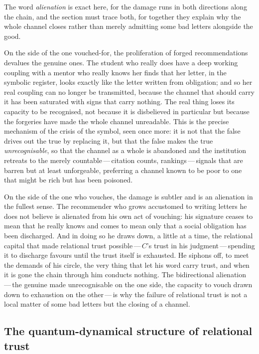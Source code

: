 The word \emph{alienation} is exact here, for the damage runs in both directions along the chain, and the section must trace both, for together they explain why the whole channel closes rather than merely admitting some bad letters alongside the good.

On the side of the one vouched-for, the proliferation of forged recommendations devalues the genuine ones. The student who really does have a deep working coupling with a mentor who really knows her finds that her letter, in the symbolic register, looks exactly like the letter written from obligation; and so her real coupling can no longer be transmitted, because the channel that should carry it has been saturated with signs that carry nothing. The real thing loses its capacity to be recognised, not because it is disbelieved in particular but because the forgeries have made the whole channel unreadable. This is the precise mechanism of the crisis of the symbol, seen once more: it is not that the false drives out the true by replacing it, but that the false makes the true \emph{unrecognisable}, so that the channel as a whole is abandoned and the institution retreats to the merely countable\,---\,citation counts, rankings\,---\,signals that are barren but at least unforgeable, preferring a channel known to be poor to one that might be rich but has been poisoned.

On the side of the one who vouches, the damage is subtler and is an alienation in the fullest sense. The recommender who grows accustomed to writing letters he does not believe is alienated from his own act of vouching: his signature ceases to mean that he really knows and comes to mean only that a social obligation has been discharged. And in doing so he draws down, a little at a time, the relational capital that made relational trust possible\,---\,$C$'s trust in his judgment\,---\,spending it to discharge favours until the trust itself is exhausted. He siphons off, to meet the demands of his circle, the very thing that let his word carry trust, and when it is gone the chain through him conducts nothing. The bidirectional alienation\,---\,the genuine made unrecognisable on the one side, the capacity to vouch drawn down to exhaustion on the other\,---\,is why the failure of relational trust is not a local matter of some bad letters but the closing of a channel.

\subsection{The quantum-dynamical structure of relational trust}
\label{p13:sub:rel-quantum}

